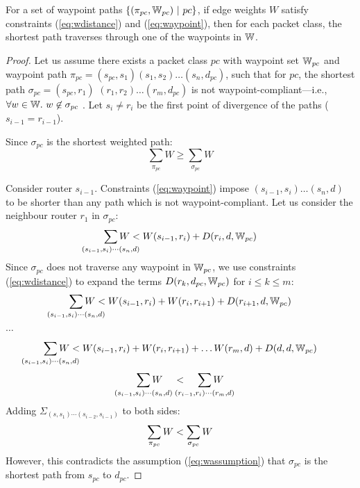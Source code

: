 
\begin{theorem}[Correctness]
	For a set of waypoint paths $\{(\pi_{pc}, \mathbb{W}_{pc}) ~|~ pc\}$, if edge weights 
	$W$ satisfy constraints (\ref{eq:wdistance}) and (\ref{eq:waypoint}), then for
	each packet class, the shortest path  
	traverses through one of the waypoints in $\mathbb{W}$.
\end{theorem}
\begin{proof}
	Let us assume there exists a packet class $pc$ with waypoint set $\mathbb{W}_{pc}$ 
	and waypoint path $\pi_{pc} = (s_{pc}, s_1)(s_1, s_2)\ldots (s_n, d_{pc})$, 
	such that for $pc$, the 
	shortest path $\sigma_{pc}=(s_{pc}, r_1)$ $(r_1, r_2)\ldots (r_m, d_{pc})$ 
	is not waypoint-compliant---i.e.,  
	$\forall w \in \mathbb{W}.~w \not\in \sigma_{pc}$ . 
	Let $s_i \not= r_i$ be the first point of divergence of the paths ($s_{i-1} = r_{i-1}$).
	
	
	Since $\sigma_{pc}$ is the shortest weighted path: 
	\begin{equation} \label{eq:wassumption}
	\sum_{\pi_{pc}} W \geq \sum_{\sigma_{pc}} W
	\end{equation}
	
Consider router $s_{i-1}$. 
Constraints (\ref{eq:waypoint}) impose 
$(s_{i-1}, s_i)\ldots(s_n, d)$ to be 
shorter than any path which is not waypoint-compliant. 
Let us consider the neighbour router $r_1$ in $\sigma_{pc}$:
	\[
	\sum_{\mathclap{\substack{(s_{i-1}, s_i)\cdots(s_n, d)}}} 
	W < W(s_{i-1}, r_i)+ D(r_i, d, \waypt_{pc})
	\]
	Since $\sigma_{pc}$ does not traverse any waypoint in $\mathbb{W}_{pc}$,
	we use constraints (\ref{eq:wdistance}) 
	to expand the terms $D(r_k, d_{pc}, \mathbb{W}_{pc})$ for $i \leq k \leq m$:
	\[
	\sum_{\mathclap{\substack{(s_{i-1}, s_i)\cdots(s_n, d)}}} 
	W < W(s_{i-1}, r_i)+ W(r_i, r_{i+1}) + D(r_{i+1}, d,\waypt_{pc})
	\] 
	\begin{center}
		$\ldots$
	\end{center}
	\[
	\sum_{\mathclap{\substack{(s_{i-1}, s_i)\cdots(s_n, d)}}} 
	W < W(s_{i-1}, r_i)+ W(r_i, r_{i+1}) + \ldots W(r_{m}, d) + D(d, d, \waypt_{pc})
	\] 
	\[
	\sum_{\mathclap{\substack{(s_{i-1}, s_i)\cdots(s_n, d)}}} 
	W \hspace{0.4cm}< \hspace{0.4cm}
	\sum_{\mathclap{\substack{(r_{i-1}, r_i)\cdots(r_m, d)}}} 
	W
	\]
	Adding $\Sigma_{(s, s_1)\cdots(s_{i-2},s_{i-1})}$ to both sides:
	\[
	\sum_{\mathclap{\substack{\pi_{pc}}}} 
	W < 
	\sum_{\mathclap{\substack{\sigma_{pc}}}} 
	W
	\] 
However, this contradicts the assumption (\ref{eq:wassumption}) that 
$\sigma_{pc}$ is the shortest path from $s_{pc}$ to $d_{pc}$. 
\end{proof}

